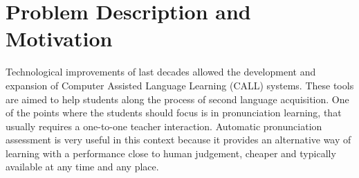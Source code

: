 
\section{Problem Description and Motivation} \label{section:motivation}

Technological improvements of last decades allowed the development and expansion of Computer
Assisted Language Learning (CALL) systems. These tools are aimed to help students along the
process of second language acquisition. One of the points where the
students should focus is in pronunciation learning, that usually requires a one-to-one teacher
interaction. Automatic pronunciation assessment is very useful in this
context because it provides an alternative way of learning with a performance close to human judgement,
cheaper and typically available at any time and any place.




